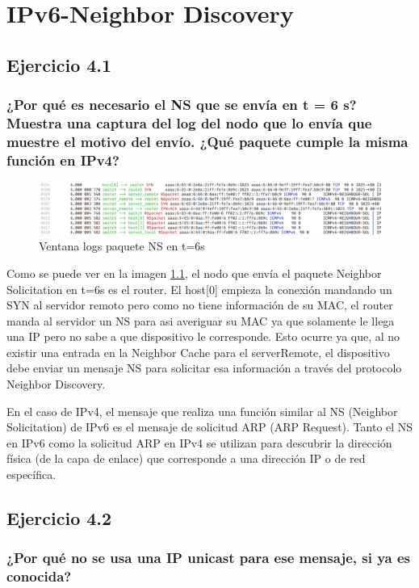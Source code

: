 \chapter{IPv6-Neighbor Discovery}
\label{chap:ipv6_nd}

\section{Ejercicio 4.1}
\subsection{¿Por qué es necesario el NS que se envía en t = 6 s? Muestra una captura del log del nodo que lo envía que muestre el motivo del envío. ¿Qué paquete cumple la misma función en IPv4?}

\begin{figure}[H]
    \centering   
    \includegraphics[width=135mm, scale=0.75]{imaxes/captura_ejer4_1.png}
    \caption{Ventana logs paquete NS en t=6s}
    \label{fig:logs_ns_t6}
\end{figure}

Como se puede ver en la imagen \ref{fig:logs_ns_t6}, el nodo que envía el paquete Neighbor Solicitation en t=6s es el router. El host[0] empieza la conexión mandando un SYN al servidor remoto pero como no tiene información de su MAC, el router manda al servidor un NS para asi averiguar su MAC ya que solamente le llega una IP pero no sabe a que dispositivo le corresponde. Esto ocurre ya que, al no existir una entrada en la Neighbor Cache para el serverRemote, el dispositivo debe enviar un mensaje NS para solicitar esa información a través del protocolo Neighbor Discovery.

En el caso de IPv4, el mensaje que realiza una función similar al NS (Neighbor Solicitation) de IPv6 es el mensaje de solicitud ARP (ARP Request). Tanto el NS en IPv6 como la solicitud ARP en IPv4 se utilizan para descubrir la dirección física (de la capa de enlace) que corresponde a una dirección IP o de red específica.

\section{Ejercicio 4.2}
\subsection{¿Por qué no se usa una IP unicast para ese mensaje, si ya es conocida?}

